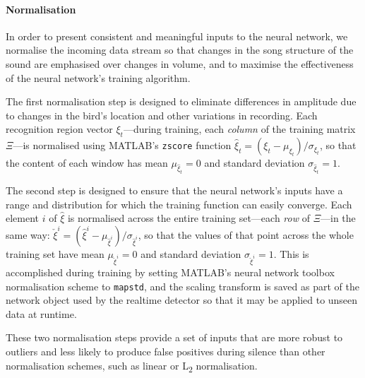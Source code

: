 \documentclass[10pt,letterpaper]{article}
\renewcommand{\subsubsection}[1]{\paragraph{#1}}
\newcommand{\noprint}[1]{}
\begin{document}
\noprint{
  repeat all measurements, let's just not mention it.  With inputs
  well outside the space on which a neural network has been trained,
  its outputs will be essentially random. In order to reduce the false
  positive rate it is useful to provide negative training examples
  that include silence, cage noise, non-song vocalisations, and
  perhaps songs from other birds.  We have found that training with as
  low as a 1:1 ratio of non-song to song yields excellent results,
  although this will depend on the makeup of the non-song data.  }

\subsubsection{Normalisation}

In order to present consistent and meaningful inputs to the neural
network, we normalise the incoming data stream so that changes in the
song structure of the sound are emphasised over changes in volume, and
to maximise the effectiveness of the neural network's training
algorithm.

The first normalisation step is designed to eliminate differences in
amplitude due to changes in the bird's location and other variations
in recording.  Each recognition region vector $\xi_t$---during
training, each {\em column} of the training matrix $\Xi$---is
normalised using MATLAB's {\tt zscore} function $\hat{\xi}_t = (\xi_t
- \mu_{\xi_t}) / \sigma_{\xi_t}$, so that the content of each window
has mean $\mu_{\hat{\xi}_t}=0$ and standard deviation
$\sigma_{\hat{\xi}_t}=1$.

The second step is designed to ensure that the neural network's inputs
have a range and distribution for which the training function can
easily converge.  Each element $i$ of $\hat{\xi}$ is normalised across
the entire training set---each {\em row} of $\Xi$---in the same way:
$\check{\xi}^i = (\hat{\xi}^i -
\mu_{\hat{\xi}^i})/\sigma_{\hat{\xi}^i}$, so that the values of that
point across the whole training set have mean $\mu_{\check{\xi}^i}=0$
and standard deviation $\sigma_{\check{\xi}^i}=1$.  This is
accomplished during training by setting MATLAB's neural network
toolbox normalisation scheme to {\tt mapstd}, and the scaling
transform is saved as part of the network object used by the realtime
detector so that it may be applied to unseen data at runtime.

These two normalisation steps provide a set of inputs that are more
robust to outliers and less likely to produce false positives during
silence than other normalisation schemes, such as linear or
L\textsubscript{2} normalisation.
\end{document}
